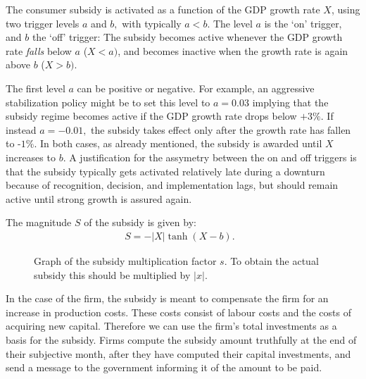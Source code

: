 \bigskip The consumer subsidy is activated as a function of the GDP growth
rate $X$, using two trigger levels $a$ and $b,$ with typically $a<b$. The
level $a$ is the `on' trigger, and $b$ the `off' trigger: 
The subsidy becomes active whenever the GDP growth rate \textit{falls} below $a$ ($%
X<a)$, and becomes inactive when the growth rate is again above $b$ ($X>b)$.

\bigskip The first level $a$ can be positive or negative. For example, an
aggressive stabilization policy might be to set this level to $a=0.03$
implying that the subsidy regime becomes active if the GDP growth rate drops
below $+3\%$. If instead $a=-0.01,$ the subsidy takes effect only after the
growth rate has fallen to -$1\%$. In both cases, as already mentioned, the
subsidy is awarded until $X$ increases to $b$. A justification for the
assymetry between the on and off triggers is that the subsidy typically gets
activated relatively late during a downturn because of recognition,
decision, and implementation lags, but should remain active until strong
growth is assured again.

\bigskip The magnitude $S$ of the subsidy is given by:
\begin{equation}
\begin{array}{l}
S=-|X|\tanh (X-b).\text{ }%
\end{array}%
\end{equation}

\begin{figure}[ht!]
\centering\leavevmode
\begin{boxedminipage}{5.5cm}
\centering\leavevmode
\resizebox{5cm}{5cm}{\sf }
\end{boxedminipage}
\caption{Graph of the subsidy multiplication factor $s$. To obtain the
actual subsidy this should be multiplied by $|x|$.}
\label{Figure: subsidy multiplication factor}
\end{figure}

In the case of the firm, the subsidy is meant to compensate the firm for an
increase in production costs. These costs consist of labour costs and the
costs of acquiring new capital. Therefore we can use the firm's total
investments as a basis for the subsidy. Firms compute the subsidy amount
truthfully at the end of their subjective month, after they have computed
their capital investments, and send a message to the government informing it
of the amount to be paid.

% 